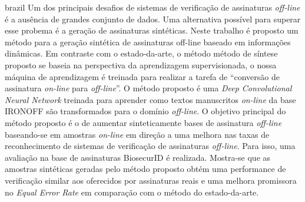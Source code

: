 \begin{resumo}[Resumo]
 \begin{otherlanguage*}{brazil}
  Um dos principais desafios de sistemas de verificação de assinaturas \textit{off-line} é a ausência de grandes conjunto de dados. Uma alternativa possível para superar esse probema é a geração de assinaturas sintéticas. Neste trabalho é proposto um método para a geração sintética de assinaturas off-line baseado em informações dinâmicas. Em contraste com o estado-da-arte, o método método de síntese proposto se baseia na perspectiva da aprendizagem supervisionada, o nossa máquina de aprendizagem é treinada para realizar a tarefa de ``conversão de assinatura \textit{on-line} para \textit{off-line}''. O método proposto é uma \textit{Deep Convolutional Neural Network} treinada para aprender como textos manuscritos \textit{on-line} da base IRONOFF são transformados para o domínio \textit{off-line}. O objetivo principal do método proposto é o de aumentar sinteticamente bases de assinatura \textit{off-line} baseando-se em amostras \textit{on-line} em direção a uma melhora nas taxas de reconhecimento de sistemas de verificação de assinaturas \textit{off-line}. Para isso, uma avaliação na base de assinaturas BiosecurID é realizada. Mostra-se que as amostras sintéticas geradas pelo método proposto obtém uma performance de verificação similar aos oferecidos por assinaturas reais e uma melhora promissora no \textit{Equal Error Rate} em comparação com o método do estado-da-arte.

   \vspace{\onelineskip}
 
   \noindent 
 \end{otherlanguage*}
\end{resumo}


